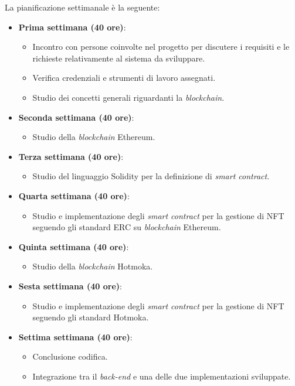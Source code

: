 \noindent La pianificazione settimanale è la seguente: 
\begin{itemize}
  \item \textbf{Prima settimana (40 ore)}:
  \begin{itemize}
      \item Incontro con persone coinvolte nel progetto per discutere i requisiti e le richieste
      relativamente al sistema da sviluppare.
      \item Verifica credenziali e strumenti di lavoro assegnati.
      \item Studio dei concetti generali riguardanti la \emph{blockchain}.
  \end{itemize}
  \item \textbf{Seconda settimana (40 ore)}:
  \begin{itemize}
      \item Studio della \emph{blockchain} Ethereum.
  \end{itemize}
  \item \textbf{Terza settimana (40 ore)}:
  \begin{itemize}
      \item Studio del linguaggio Solidity per la definizione di \emph{smart contract}.
  \end{itemize}
  \item \textbf{Quarta settimana (40 ore)}:
  \begin{itemize}
      \item Studio e implementazione degli \emph{smart contract} per la gestione di NFT seguendo gli standard ERC su \emph{blockchain} Ethereum.
  \end{itemize}
  \item \textbf{Quinta settimana (40 ore)}:
  \begin{itemize}
      \item Studio della \emph{blockchain} Hotmoka.
  \end{itemize}
  \item \textbf{Sesta settimana (40 ore)}:
  \begin{itemize}
      \item Studio e implementazione degli \emph{smart contract} per la gestione di NFT seguendo gli standard Hotmoka.
  \end{itemize}
  \item \textbf{Settima settimana (40 ore)}:
  \begin{itemize}
      \item Conclusione codifica.
      \item Integrazione tra il \emph{back-end} e una delle due implementazioni sviluppate.

\end{itemize}
\end{itemize}

